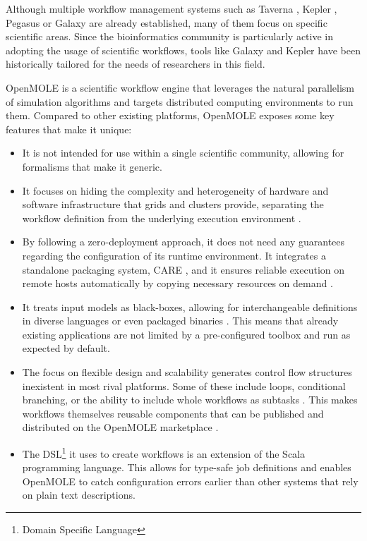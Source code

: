 Although multiple workflow management systems such as Taverna \cite{Taverna}, Kepler \cite{Kepler}, Pegasus \cite{Pegasus} or Galaxy \cite{Galaxy} are already established, many of them focus on specific scientific areas. Since the bioinformatics community is particularly active in adopting the usage of scientific workflows, tools like Galaxy and Kepler have been historically tailored for the needs of researchers in this field.

OpenMOLE \cite{Reuillon2013} is a scientific workflow engine that leverages the natural parallelism of simulation algorithms and targets distributed computing environments to run them. Compared to other existing platforms, OpenMOLE exposes some key features that make it unique:

\begin{itemize}
	\item It is not intended for use within a single scientific community, allowing for formalisms that make it generic.
	\item It focuses on hiding the complexity and heterogeneity of hardware and software infrastructure that grids and clusters provide, separating the workflow definition from the underlying execution environment \cite{Reuillon2010}.
	\item By following a zero-deployment approach, it does not need any guarantees regarding the configuration of its runtime environment. It integrates a standalone packaging system, CARE \cite{Janin2014}, and it ensures reliable execution on remote hosts automatically by copying necessary resources on demand \cite{Reuillon2015}.
	\item It treats input models as black-boxes, allowing for interchangeable definitions in diverse languages or even packaged binaries \cite{Reuillon2013}. This means that already existing applications are not limited by a pre-configured toolbox and run as expected by default.
	\item The focus on flexible design and scalability generates control flow structures inexistent in most rival platforms. Some of these include loops, conditional branching, or the ability to include whole workflows as subtasks \cite{Reuillon2013}. This makes workflows themselves reusable components that can be published and distributed on the OpenMOLE marketplace \cite{OpenMOLEMarketplace}.
	\item The DSL\footnote{Domain Specific Language} it uses to create workflows is an extension of the Scala \cite{Scala} programming language. This allows for type-safe job definitions and enables OpenMOLE to catch configuration errors earlier than other systems that rely on plain text descriptions.
\end{itemize}

